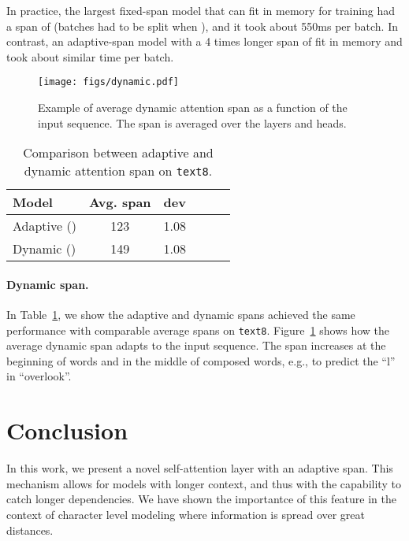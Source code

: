 \documentclass[11pt,a4paper]{article}
\begin{document}
In practice, the largest fixed-span model that can fit in memory for training had a span of  (batches had to be split when ), and it took about 550ms per batch. In contrast, an adaptive-span model with a 4 times longer span of  fit in memory and took about similar time per batch.

\begin{figure}[t]
\centering
\texttt{[image: figs/dynamic.pdf]}\\
\vspace{-2mm}
\caption{
  Example of average dynamic attention span as a function of the input sequence.
  The span is averaged over the layers and heads.}
\label{fig:dynamic}
\end{figure}

\begin{table}[t]
\centering
\begin{tabular}{lccccc}
  \toprule
  Model & Avg. span & dev \\
  \midrule
  Adaptive () & 123 & 1.08\\
  Dynamic () & 149 & 1.08 \\
  \bottomrule
\end{tabular}
  \caption{
    Comparison between adaptive and dynamic attention span on \texttt{text8}.
  }
  \vspace{-4mm}
\label{tab:dynamic}
\end{table}

\paragraph{Dynamic span.}
In Table~\ref{tab:dynamic}, we show the adaptive and dynamic spans achieved the same performance with comparable average spans on \texttt{text8}.
Figure~\ref{fig:dynamic} shows how the average dynamic span adapts to the input sequence.
The span increases at the beginning of words and in the middle of composed words, e.g., to predict the ``l'' in ``overlook''.
 
\section{Conclusion}
In this work, we present a novel self-attention layer with an adaptive span.
This mechanism allows for models with longer context, and thus with the capability to catch longer dependencies.
We have shown the importantce of this feature in the context of character level modeling where information is spread over great distances.





\end{document}
